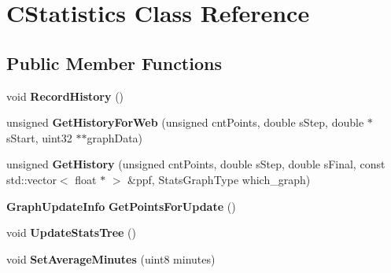 \section{CStatistics Class Reference}
\label{classCStatistics}
\subsection*{Public Member Functions}
\begin{DoxyCompactItemize}
\item 
void {\bfseries RecordHistory} ()\label{classCStatistics_a66fdcd4f43ab304095d3a91fcc59e381}

\item 
unsigned {\bfseries GetHistoryForWeb} (unsigned cntPoints, double sStep, double $\ast$sStart, uint32 $\ast$$\ast$graphData)\label{classCStatistics_a5c8538ba6d9f657162675d938296ccb9}

\item 
unsigned {\bfseries GetHistory} (unsigned cntPoints, double sStep, double sFinal, const std::vector$<$ float $\ast$ $>$ \&ppf, StatsGraphType which\_\-graph)\label{classCStatistics_a229a64016ee4609cc9d7c9828996dd9d}

\item 
{\bf GraphUpdateInfo} {\bfseries GetPointsForUpdate} ()\label{classCStatistics_a2cb4c1ab93223f02852e91289d4e76e4}

\item 
void {\bfseries UpdateStatsTree} ()\label{classCStatistics_a136745b987144d4be550cff77692a3ed}

\item 
void {\bfseries SetAverageMinutes} (uint8 minutes)\label{classCStatistics_a71ee7f8585e321f37a28f04735737352}

\end{DoxyCompactItemize}
